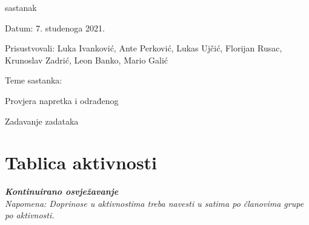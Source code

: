 \begin{packed_enum}
			\item  sastanak
			\item[] \begin{packed_item}
				\item Datum: 7. studenoga 2021.
				\item Prisustvovali: Luka Ivanković, Ante Perković, Lukas Ujčić, Florijan Rusac, Krunoslav Zadrić, Leon Banko, Mario Galić 
				\item Teme sastanka:
				\begin{packed_item}
					\item  Provjera napretka i odrađenog
					\item Zadavanje zadataka
				\end{packed_item}
			\end{packed_item}
			
			
		\end{packed_enum}
		
		\eject
		\section*{Tablica aktivnosti}
		
			\textbf{\textit{Kontinuirano osvježavanje}}\\
			
			 \textit{Napomena: Doprinose u aktivnostima treba navesti u satima po članovima grupe po aktivnosti.}

